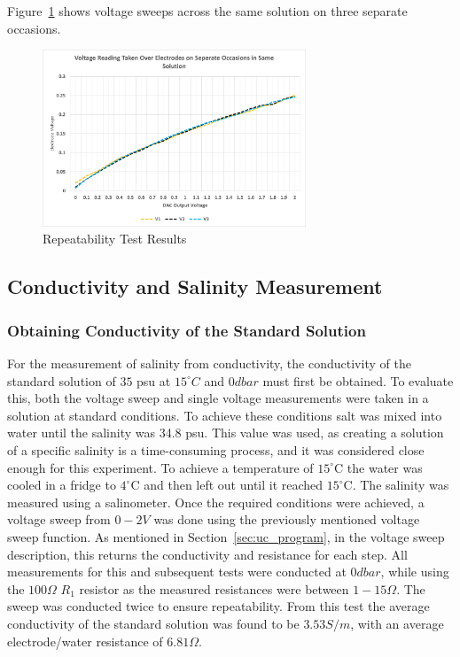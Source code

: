 Figure~\ref{fig:repeatability_test} shows voltage sweeps across the same solution on three separate occasions.
\begin{figure}[H]
    \centering
    \includegraphics[width=0.7\textwidth]{figures/repeatability_test.png}
    \caption{Repeatability Test Results}
    \label{fig:repeatability_test}
\end{figure}

\subsection{Conductivity and Salinity Measurement}

\subsubsection{Obtaining Conductivity of the Standard Solution}
For the measurement of salinity from conductivity, the conductivity of the standard solution of $35$ \gls{psu} at $15^{\circ}C$ and $0dbar$ must first be obtained.
To evaluate this, both the voltage sweep and single voltage measurements were taken in a solution at standard conditions.
To achieve these conditions salt was mixed into water until the salinity was 34.8 \gls{psu}.
This value was used, as creating a solution of a specific salinity is a time-consuming process, and it was considered close enough for this experiment.
To achieve a temperature of $15^\circ$C the water was cooled in a fridge to $4^\circ$C and then left out until it reached $15^\circ$C.
The salinity was measured using a salinometer.
Once the required conditions were achieved, a voltage sweep from $0-2V$ was done using the previously mentioned voltage sweep function.
As mentioned in Section~\ref{sec:uc_program}, in the voltage sweep description, this returns the conductivity and resistance for each step.
All measurements for this and subsequent tests were conducted at $0dbar$, while using the $100\Omega$ $R_1$ resistor as the measured resistances were between $1-15\Omega$.
The sweep was conducted twice to ensure repeatability.
From this test the average conductivity of the standard solution was found to be $3.53 S/m$, with an average electrode/water resistance of $6.81\Omega$.

